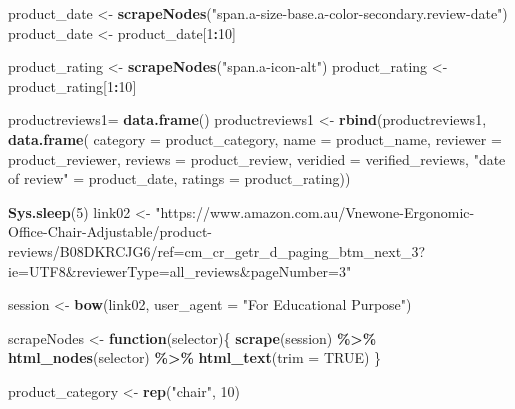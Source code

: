 \documentclass[
]{article}
\newenvironment{Shaded}{\begin{snugshade}}{\end{snugshade}}
\newcommand{\AttributeTok}[1]{\textcolor[rgb]{0.13,0.29,0.53}{#1}}
\newcommand{\ConstantTok}[1]{\textcolor[rgb]{0.56,0.35,0.01}{#1}}
\newcommand{\ControlFlowTok}[1]{\textcolor[rgb]{0.13,0.29,0.53}{\textbf{#1}}}
\newcommand{\DecValTok}[1]{\textcolor[rgb]{0.00,0.00,0.81}{#1}}
\newcommand{\FunctionTok}[1]{\textcolor[rgb]{0.13,0.29,0.53}{\textbf{#1}}}
\newcommand{\NormalTok}[1]{#1}
\newcommand{\OtherTok}[1]{\textcolor[rgb]{0.56,0.35,0.01}{#1}}
\newcommand{\SpecialCharTok}[1]{\textcolor[rgb]{0.81,0.36,0.00}{\textbf{#1}}}
\newcommand{\StringTok}[1]{\textcolor[rgb]{0.31,0.60,0.02}{#1}}
\begin{document}
\begin{Shaded}
\begin{Highlighting}[]
\NormalTok{  product\_date }\OtherTok{\textless{}{-}} \FunctionTok{scrapeNodes}\NormalTok{(}\StringTok{"span.a{-}size{-}base.a{-}color{-}secondary.review{-}date"}\NormalTok{)}
\NormalTok{  product\_date }\OtherTok{\textless{}{-}}\NormalTok{ product\_date[}\DecValTok{1}\SpecialCharTok{:}\DecValTok{10}\NormalTok{]}
  
\NormalTok{  product\_rating }\OtherTok{\textless{}{-}} \FunctionTok{scrapeNodes}\NormalTok{(}\StringTok{"span.a{-}icon{-}alt"}\NormalTok{)}
\NormalTok{  product\_rating }\OtherTok{\textless{}{-}}\NormalTok{ product\_rating[}\DecValTok{1}\SpecialCharTok{:}\DecValTok{10}\NormalTok{]}
  
\NormalTok{  productreviews1}\OtherTok{=} \FunctionTok{data.frame}\NormalTok{()}
\NormalTok{  productreviews1 }\OtherTok{\textless{}{-}} \FunctionTok{rbind}\NormalTok{(productreviews1, }\FunctionTok{data.frame}\NormalTok{(}
                      \AttributeTok{category =}\NormalTok{ product\_category,}
                      \AttributeTok{name =}\NormalTok{ product\_name,}
                      \AttributeTok{reviewer =}\NormalTok{ product\_reviewer,}
                      \AttributeTok{reviews =}\NormalTok{ product\_review,}
                      \AttributeTok{veridied =}\NormalTok{ verified\_reviews,}
                      \StringTok{"date of review"} \OtherTok{=}\NormalTok{ product\_date,}
                      \AttributeTok{ratings =}\NormalTok{ product\_rating))}

  
\FunctionTok{Sys.sleep}\NormalTok{(}\DecValTok{5}\NormalTok{)}
\NormalTok{link02 }\OtherTok{\textless{}{-}} \StringTok{"https://www.amazon.com.au/Vnewone{-}Ergonomic{-}Office{-}Chair{-}Adjustable/product{-}reviews/B08DKRCJG6/ref=cm\_cr\_getr\_d\_paging\_btm\_next\_3?ie=UTF8\&reviewerType=all\_reviews\&pageNumber=3"}


\NormalTok{  session }\OtherTok{\textless{}{-}} \FunctionTok{bow}\NormalTok{(link02,}
               \AttributeTok{user\_agent =} \StringTok{"For Educational Purpose"}\NormalTok{)}

\NormalTok{  scrapeNodes }\OtherTok{\textless{}{-}} \ControlFlowTok{function}\NormalTok{(selector)\{}
    \FunctionTok{scrape}\NormalTok{(session) }\SpecialCharTok{\%\textgreater{}\%}
      \FunctionTok{html\_nodes}\NormalTok{(selector) }\SpecialCharTok{\%\textgreater{}\%}
      \FunctionTok{html\_text}\NormalTok{(}\AttributeTok{trim =} \ConstantTok{TRUE}\NormalTok{)}
\NormalTok{  \}}

\NormalTok{  product\_category }\OtherTok{\textless{}{-}} \FunctionTok{rep}\NormalTok{(}\StringTok{"chair"}\NormalTok{, }\DecValTok{10}\NormalTok{)}


\end{Highlighting}
\end{Shaded}
\end{document}
